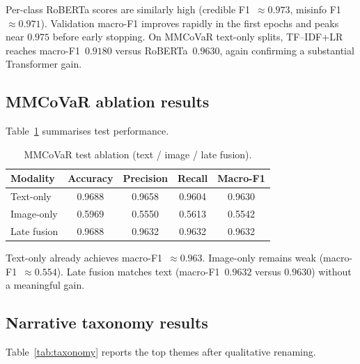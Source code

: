 \documentclass[12pt, a4paper]{report}
\begin{document}
Per-class RoBERTa scores are similarly high (credible F1~$\approx 0.973$, misinfo F1~$\approx 0.971$).
Validation macro-F1 improves rapidly in the first epochs and peaks near $0.975$ before early stopping.
On MMCoVaR text-only splits, TF--IDF+LR reaches macro-F1~$0.9180$ versus RoBERTa~$0.9630$, again confirming a substantial Transformer gain.

\subsection{MMCoVaR ablation results}

Table~\ref{tab:ablation} summarises test performance.

\begin{table}[htbp]
\centering
\caption{MMCoVaR test ablation (text / image / late fusion).}
\label{tab:ablation}
\begin{tabular}{lcccc}
\hline
Modality & Accuracy & Precision & Recall & Macro-F1 \\
\hline
Text-only   & 0.9688 & 0.9658 & 0.9604 & 0.9630 \\
Image-only  & 0.5969 & 0.5550 & 0.5613 & 0.5542 \\
Late fusion & 0.9688 & 0.9632 & 0.9632 & 0.9632 \\
\hline
\end{tabular}
\end{table}

Text-only already achieves macro-F1~$\approx 0.963$.
Image-only remains weak (macro-F1~$\approx 0.554$).
Late fusion matches text (macro-F1~$0.9632$ versus $0.9630$) without a meaningful gain.

\subsection{Narrative taxonomy results}

Table~\ref{tab:taxonomy} reports the top themes after qualitative renaming.
\end{document}
